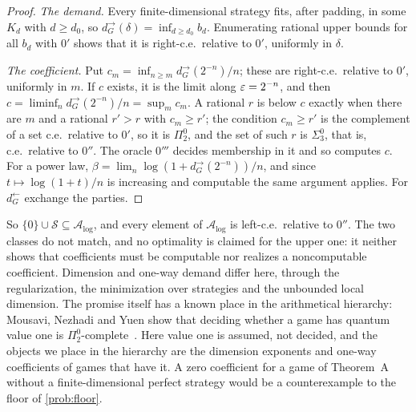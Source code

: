 \begin{proof}
\emph{The demand.} Every finite-dimensional strategy fits, after padding, in some $K_d$ with $d\ge d_0$, so
$d^\to_G(\delta)=\inf_{d\ge d_0}b_d$. Enumerating rational upper bounds for all $b_d$ with $0'$ shows that it is right-c.e.\ relative to $0'$,
uniformly in $\delta$.

\emph{The coefficient.} Put $c_m=\inf_{n\ge m}d^\to_G(2^{-n})/n$; these are right-c.e.\ relative to $0'$, uniformly in $m$. If $c$ exists, it is
the limit along $\varepsilon=2^{-n}$, and then $c=\liminf_n d^\to_G(2^{-n})/n=\sup_mc_m$. A rational $r$ is below $c$ exactly when there are $m$ and a
rational $r'>r$ with $c_m\ge r'$; the condition $c_m\ge r'$ is the complement of a set c.e.\ relative to $0'$, so it is $\Pi^0_2$, and the set
of such $r$ is $\Sigma^0_3$, that is, c.e.\ relative to $0''$. The oracle $0'''$ decides membership in it and so computes $c$. For a power law,
$\beta=\lim_n\log(1+d^\to_G(2^{-n}))/n$, and since $t\mapsto\log(1+t)/n$ is increasing and computable the same argument applies. For
$d^\leftarrow_G$ exchange the parties.
\end{proof}

So $\{0\}\cup\mathcal S\subseteq\mathcal A_{\log}$, and every element of $\mathcal A_{\log}$ is left-c.e.\ relative to $0''$. The two classes do not
match, and no optimality is claimed for the upper one: it neither shows that coefficients must be computable nor realizes a noncomputable
coefficient. Dimension and one-way demand differ here, through the regularization, the minimization over strategies and the unbounded
local dimension. The promise itself has a known place in the arithmetical hierarchy: Mousavi, Nezhadi and Yuen show that deciding
whether a game has quantum value one is $\Pi^0_2$-complete~\cite[Theorem~1.1]{MNY22}. Here value one is assumed, not decided, and the
objects we place in the hierarchy are the dimension exponents and one-way coefficients of games that have it. A zero coefficient
for a game of Theorem~A without a finite-dimensional perfect strategy would be a counterexample to the floor of \cref{prob:floor}.
